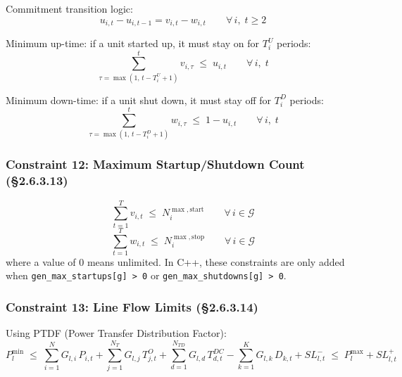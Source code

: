 Commitment transition logic:
\begin{equation}\label{eq:transition}
  u_{i,t} - u_{i,t-1} = v_{i,t} - w_{i,t}
  \qquad \forall\, i,\; t \geq 2
\end{equation}

Minimum up-time: if a unit started up, it must stay on for $T^{U}_i$ periods:
\begin{equation}\label{eq:min-up}
  \sum_{\tau=\max(1,\,t-T^{U}_i+1)}^{t} v_{i,\tau} \;\leq\; u_{i,t}
  \qquad \forall\, i,\; t
\end{equation}

Minimum down-time: if a unit shut down, it must stay off for $T^{D}_i$ periods:
\begin{equation}\label{eq:min-down}
  \sum_{\tau=\max(1,\,t-T^{D}_i+1)}^{t} w_{i,\tau} \;\leq\; 1 - u_{i,t}
  \qquad \forall\, i,\; t
\end{equation}

\subsubsection{Constraint 12: Maximum Startup/Shutdown Count (§2.6.3.13)}\label{sec:scuc-max-susd}

\begin{equation}\label{eq:max-starts}
  \sum_{t=1}^{T} v_{i,t} \;\leq\; N^{\max,\mathrm{start}}_i
  \qquad \forall\, i \in \mathcal{G}
\end{equation}
\begin{equation}\label{eq:max-stops}
  \sum_{t=1}^{T} w_{i,t} \;\leq\; N^{\max,\mathrm{stop}}_i
  \qquad \forall\, i \in \mathcal{G}
\end{equation}
where a value of 0 means unlimited. In C++, these constraints are only added
when \texttt{gen\_max\_startups[g] > 0} or \texttt{gen\_max\_shutdowns[g] > 0}.

\subsubsection{Constraint 13: Line Flow Limits (§2.6.3.14)}\label{sec:scuc-line}

Using PTDF (Power Transfer Distribution Factor):
\begin{equation}\label{eq:line-flow}
  P^{\min}_l \;\leq\;
  \sum_{i=1}^{N} G_{l,i}\, P_{i,t}
  + \sum_{j=1}^{N_T} G_{l,j}\, T^{O}_{j,t}
  + \sum_{d=1}^{N_{TD}} G_{l,d}\, T^{DC}_{d,t}
  - \sum_{k=1}^{K} G_{l,k}\, D_{k,t}
  + SL^{-}_{l,t}
  \;\leq\;
  P^{\max}_l + SL^{+}_{l,t}
\end{equation}

